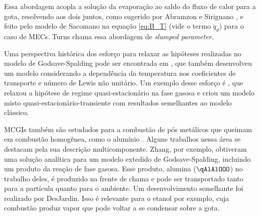 Essa abordagem acopla a solução da evaporação ao saldo do fluxo de calor para a gota, resolvendo aos dois juntos, como sugerido por Abramzon e Sirignano \cite{Sirignano1989}, e feito pelo modelo de Sacomano\etal \cite{SacomanoF2022IJHMT} na equação \eqref{eq:B_T} (vide o termo $\dot q_d$) para o caso de MECs.
Turns \cite{Turns2000} chama essa abordagem de \emph{slumped parameter.}

Uma perspectiva histórica dos esforço para relaxar as hipóteses realizadas no modelo de Godsave-Spalding pode ser encontrada em \cite{FachiniF1999}, que também desenvolveu um modelo considerando a dependência da temperatura nos coeficientes de transporte e número de Lewis não unitário.
Um exemplo desse esforço é \cite{UlzamaS2007}, que relaxou a hipótese de regime quasi-estacionário na fase gasosa e criou um modelo misto quasi-estacionário-transiente com resultados semelhantes ao modelo clássico.

MCGIs também são estudados para a combustão de pós metálicos que queimam em combustão homogênea, como o alumínio \cite[p. 7]{Bergthorson2015}.
Alguns trabalhos nessa área se destacam pela sua descrição multicomponente. 
Zhang\etal \cite{Zhang2022_Coflow,Zhang2022_Counterflow}, por exemplo, obtiveram uma solução analítica para um modelo extedido de Godsave-Spalding, incluindo um produto da reação de fase gasosa.
Esse produto, alumina ($\qAlAlOOO$) no trabalho deles, é produzido na frente de chama e pode ser transportado tanto para a partícula quanto para o ambiente.
Um desenvolvimento semelhante foi realizado por DesJardin\etal \cite{DesJardin2005}.
Isso é relevante para o etanol por exemplo, cuja combustão produz vapor que pode voltar a se condensar sobre a gota.



